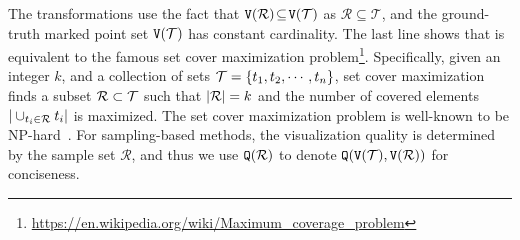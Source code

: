 
The transformations use the fact that $\mathtt{V}(\mathcal{R}) \!\subseteq \! \mathtt{V}(\mathcal{T})$ as $\mathcal{R}\! \subseteq \! \mathcal{T}$, and the ground-truth marked point set $\mathtt{V}(\mathcal{T})$ has constant cardinality.
The last line shows that \prob{} is equivalent to the famous set cover maximization problem\footnote{\url{https://en.wikipedia.org/wiki/Maximum_coverage_problem}}.
Specifically, given an integer $k$, and a collection of sets $\mathcal{T} = \{t_1, t_2, \cdots, t_n \}$,
set cover maximization finds a subset $\mathcal{R} \subset \mathcal{T}$ such that $|\mathcal{R}| = k$ and the number of covered elements $|\cup_{t_i \in \mathcal{R}} t_i|$ is maximized.
The set cover maximization problem is well-known to be NP-hard~\cite{algorithms}.
For sampling-based methods, the visualization quality is determined by the sample set $\mathcal{R}$,
and thus we use $\mathtt{Q}(\mathcal{R})$ to denote $\mathtt{Q}(\mathtt{V}(\mathcal{T}), \mathtt{V}(\mathcal{R}))$ for conciseness.







